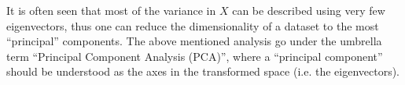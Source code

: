 It is often seen that most of the variance in $X$ can be described using very few eigenvectors, thus one can reduce the dimensionality of a dataset to the most ``principal'' components.
The above mentioned analysis go under the umbrella term ``Principal Component Analysis (PCA)'', where a ``principal component'' should be understood as the axes in the transformed space (i.e. the eigenvectors).
